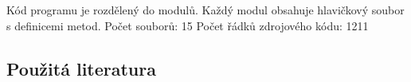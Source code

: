 \documentclass[a4paper,11pt]{article}
\begin{document}
Kód programu je rozdělený do modulů. Každý modul obsahuje hlavičkový soubor s definicemi metod. \newline\newline
Počet souborů: 15 \newline
Počet řádků zdrojového kódu: 1211

\subsection{Použitá literatura}

\nocite{*}




\newpage
\thispagestyle{empty}
\end{document}
